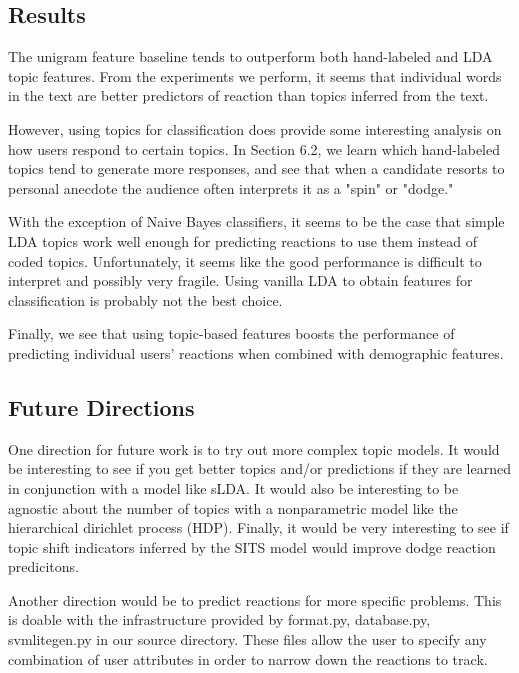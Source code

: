 
\subsection{Results}

The unigram feature baseline tends to outperform both hand-labeled and LDA topic features. From the experiments we perform, it seems that individual words in the text are better predictors of reaction than topics inferred from the text.

However, using topics for classification does provide some interesting analysis on how users respond to certain topics. In Section 6.2, we learn which hand-labeled topics tend to generate more responses, and see that when a candidate resorts to personal anecdote the audience often interprets it as a "spin" or "dodge."

With the exception of Naive Bayes classifiers, it seems to be the case that simple LDA topics work well enough for predicting reactions to use them instead of coded topics. 
Unfortunately, it seems like the good performance is difficult to interpret and possibly very fragile.
Using vanilla LDA to obtain features for classification is probably not the best choice.

Finally, we see that using topic-based features boosts the performance of predicting individual users' reactions when combined with demographic features.

\subsection{Future Directions}

One direction for future work is to try out more complex topic models.
It would be interesting to see if you get better topics and/or predictions if they are learned in conjunction with a model like sLDA.
It would also be interesting to be agnostic about the number of topics with a nonparametric model like the hierarchical dirichlet process (HDP).
Finally, it would be very interesting to see if topic shift indicators inferred by the SITS model would improve dodge reaction predicitons.

Another direction would be to predict reactions for more specific problems.
This is doable with the infrastructure provided by format.py, database.py, svmlitegen.py in our source directory.
These files allow the user to specify any combination of user attributes in order to narrow down the reactions to track.

